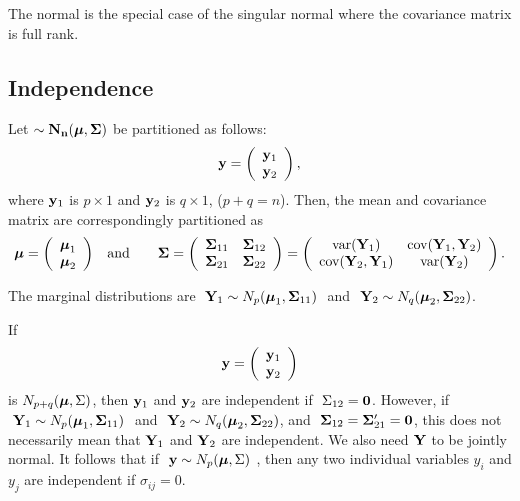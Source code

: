 The normal is the special case of the singular normal where the covariance
matrix is full rank. 


\subsection{Independence}

Let $\bf\sim N_n(\mbox{\boldmath $\mu$},\mathbf{\Sigma})$ be partitioned as follows:
$$\mathbf{y}=\left(\begin{array}{c}\mathbf{y}_1 \\ \mathbf{y}_2 \end{array}\right),$$
where $\mathbf{y}_1$ is $p\times 1$ and $\mathbf{y}_2$ is $q\times 1$, ($p+q=n$).
Then, the mean and covariance matrix are correspondingly partitioned as
\begin{eqnarray*}
\mbox{\boldmath $\mu$}=\left(\begin{array}{c}\mbox{\boldmath $\mu$}_1 \\ \mbox{\boldmath $\mu$}_2 \end{array}\right)
& \quad \mbox{and} \quad &
\mathbf{\Sigma}
=\left(\begin{array}{cc}
	\mathbf{\Sigma}_{11} & \mathbf{\Sigma}_{12}\\
	\mathbf{\Sigma}_{21} & \mathbf{\Sigma}_{22}
\end{array}\right)
=\left(\begin{array}{cc}
	\mathrm{var}(\mathbf{Y}_1) & \mathrm{cov}(\mathbf{Y}_1,\mathbf{Y}_2) \\
	\mathrm{cov}(\mathbf{Y}_2,\mathbf{Y}_1) & \mathrm{var}(\mathbf{Y}_2)
\end{array}\right).
\end{eqnarray*}

The marginal distributions are $\ \bfY_1 \sim
N_p(\bfmu_1,\bfSigma_{11})\ $ and $\ \bfY_2 \sim
N_q(\bfmu_2,\bfSigma_{22})$.

\vb
If $$\mathbf{y}=\left(\begin{array}{c}\mathbf{y}_1 \\ \mathbf{y}_2 \end{array}\right)$$ is $N_{p+q}(\mbox{\boldmath $\mu$}, \Sigma)$, then 
$\mathbf{y}_1$ and $\mathbf{y}_2$ are independent if $\ \Sigma_{12} = {\bf \mathbf{0}}$.
However, if $\ \bfY_1 \sim N_p(\bfmu_1,\bfSigma_{11})\ $ and $\ \bfY_2 \sim N_q(\bfmu_2,\bfSigma_{22})$, and $\ \bfSigma_{12} = \bfSigma'_{21}=\zero$, this does not necessarily mean that $\mathbf{Y}_1$ and $\mathbf{Y}_2$ are independent. We also need $\mathbf{Y}$ to be jointly normal. It follows that if $\ \mathbf{y} \sim N_p(\mbox{\boldmath $\mu$}, \Sigma)\ $, then any two individual variables $y_i$ and $y_j$ are independent if $\sigma_{ij}=0$.


